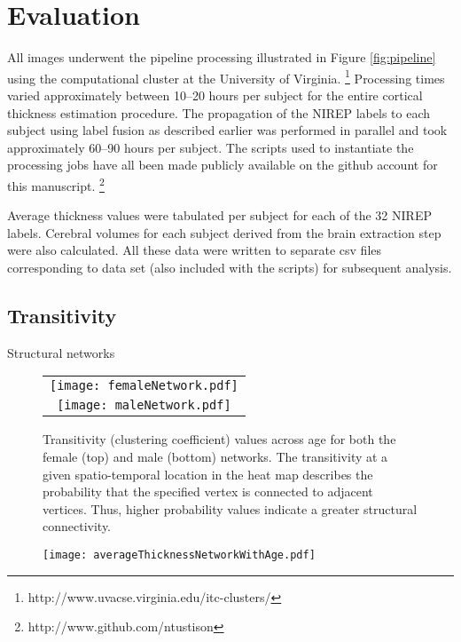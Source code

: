 \section{Evaluation}

All images underwent the pipeline processing illustrated in Figure 
\ref{fig:pipeline} using the computational cluster at the University 
of Virginia.%
\footnote{
http://www.uvacse.virginia.edu/itc-clusters/
}  
Processing times varied approximately between 10--20 hours per subject
for the entire cortical thickness estimation procedure.  The propagation of the
NIREP labels to each subject using label fusion as described earlier
was performed in parallel and took approximately 60--90 hours per 
subject.  The scripts used to instantiate the processing jobs have all been made 
publicly available on the github account for this manuscript.%
\footnote{
http://www.github.com/ntustison
}

Average thickness values were tabulated per subject for each of the
32 NIREP labels.  Cerebral volumes for each subject derived from the brain 
extraction step were also calculated.  All these data were written to separate csv
files corresponding to data set (also included with the scripts) for subsequent 
analysis.

\subsection{Transitivity}
Structural networks \cite{he2007,chen2008}


\begin{figure*}
  \centering
  \begin{tabular}{c}
  \texttt{[image: femaleNetwork.pdf]} \\
  \texttt{[image: maleNetwork.pdf]}
  \end{tabular}
  \caption{Transitivity (clustering coefficient) values across age for both the female (top)
  and male (bottom) networks.  The transitivity at a given spatio-temporal
  location in the heat map describes the probability that the specified 
  vertex is connected to adjacent vertices.  Thus, higher probability values indicate a
  greater structural connectivity.
  }
  \label{fig:network}
\end{figure*}

\begin{figure}
  \centering
  \texttt{[image: averageThicknessNetworkWithAge.pdf]}
  \caption{ 
  }
  \label{fig:corr_vs_age}
\end{figure}



